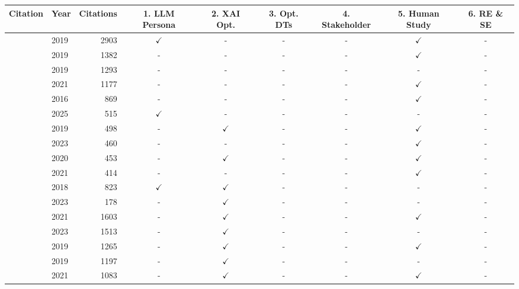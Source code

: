 \begin{table}[t]
\centering
\tiny
\setlength{\tabcolsep}{1pt} %

\begin{minipage}{0.59\textwidth}
\centering
\begin{tabular}{llrcccccc}
\hline
\textbf{Citation} & \textbf{Year} & \textbf{Citations} & \textbf{1. LLM Persona} & \textbf{2. XAI Opt.} & \textbf{3. Opt. DTs} & \textbf{4. Stakeholder} & \textbf{5. Human Study} & \textbf{6. RE \& SE} \\
\hline
\cite{HAI_interaction} & 2019 & 2903 & $\checkmark$ & - & - & - & $\checkmark$ & - \\
\cite{shrestha2019organizational} & 2019 & 1382 & - & - & - & - & $\checkmark$ & - \\
\cite{marcus2019rebooting} & 2019 & 1293 & - & - & - & - & - & - \\
\cite{trust_or_think} & 2021 & 1177 & - & - & - & - & $\checkmark$ & - \\
\cite{de2016almost} & 2016 & 869 & - & - & - & - & $\checkmark$ & - \\
\cite{lee2025impact} & 2025 & 515 & $\checkmark$ & - & - & - & - & - \\
\cite{dodge2019explaining} & 2019 & 498 & - & $\checkmark$ & - & - & $\checkmark$ & - \\
\cite{kaplan2023trust} & 2023 & 460 & - & - & - & - & $\checkmark$ & - \\
\cite{buccinca2020proxy} & 2020 & 453 & - & $\checkmark$ & - & - & $\checkmark$ & - \\
\cite{rheu2021systematic} & 2021 & 414 & - & - & - & - & $\checkmark$ & - \\
\cite{camburu2018snli} & 2018 & 823 & $\checkmark$ & $\checkmark$ & - & - & - & - \\
\cite{2023_Cambria} & 2023 & 178 & - & $\checkmark$ & - & - & - & - \\
\cite{Shin2021_ExplainabilityCausability} & 2021 & 1603 & - & $\checkmark$ & - & - & $\checkmark$ & - \\
\cite{Dwivedi2023_ExplainableAI} & 2023 & 1513 & - & $\checkmark$ & - & - & - & - \\
\cite{wang2019designing} & 2019 & 1265 & - & $\checkmark$ & - & - & $\checkmark$ & - \\
\cite{xu2019explainable} & 2019 & 1197 & - & $\checkmark$ & - & - & - & - \\
\cite{mohseni2021multidisciplinary} & 2021 & 1083 & - & $\checkmark$ & - & - & $\checkmark$ & - \\

\end{tabular}
\end{minipage}
\end{table}
